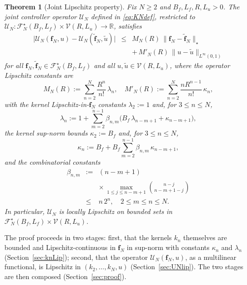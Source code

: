 \documentclass[twocolumn,amsthm]{autart}
\newcommand{\R}{\mathbb{R}}
\newcommand{\Linf}{L^\infty}
\theoremstyle{plain}
\newtheorem{theorem}{Theorem}
\theoremstyle{definition}
\begin{document}
\begin{theorem}[Joint Lipschitz property]
\label{thm:main}
Fix $N\ge 2$ and $B_f, L_f, R, L_u > 0$. The joint controller operator $\mathcal{U}_N$ defined in \eqref{eq:KNdef}, restricted to $\mathcal{U}_N \colon \mathcal{F}_N^\star(B_f,L_f) \times \mathcal{V}(R,L_u) \to \R$, satisfies
\begin{eqnarray}
\bigl|\mathcal{U}_N(\mathbf{f}_N,u) - \mathcal{U}_N(\tilde{\mathbf{f}}_N,\tilde u)\bigr| &\le& M_N(R)\,\|\mathbf{f}_N-\tilde{\mathbf{f}}_N\|_\star \nonumber \\
&& +\, M'_N(R)\,\|u-\tilde u\|_{\Linf(0,1)}
\label{eq:joint-Lip}
\end{eqnarray}
for all $\mathbf{f}_N,\tilde{\mathbf{f}}_N\in\mathcal{F}_N^\star(B_f,L_f)$ and all $u,\tilde u\in\mathcal{V}(R,L_u)$, where the operator Lipschitz constants are
\begin{equation}
M_N(R) := \sum_{n=2}^N \frac{R^n}{n!}\,\lambda_n, \quad M'_N(R) := \sum_{n=2}^N \frac{n R^{n-1}}{n!}\,\kappa_n,
\label{eq:M-def}
\end{equation}
with the kernel Lipschitz-in-$\mathbf{f}_N$ constants $\lambda_2 := 1$ and, for $3\le n\le N$,
\begin{equation}
\lambda_n := 1 + \sum_{m=2}^{n-1} \beta_{n,m}\bigl(B_f\,\lambda_{n-m+1} + \kappa_{n-m+1}\bigr),
\label{eq:lambda-def}
\end{equation}
the kernel sup-norm bounds $\kappa_2 := B_f$ and, for $3\le n\le N$,
\begin{equation}
\kappa_n := B_f + B_f\sum_{m=2}^{n-1} \beta_{n,m}\,\kappa_{n-m+1},
\label{eq:kappa-def}
\end{equation}
and the combinatorial constants
\begin{eqnarray}
\beta_{n,m} &:=& (n-m+1) \nonumber \\
&& \times\, \max_{1\le j\le n-m+1}\binom{n-j}{n-m+1-j} \nonumber \\
&\le& n\,2^n, \quad 2\le m\le n\le N.
\label{eq:beta-def}
\end{eqnarray}
In particular, $\mathcal{U}_N$ is locally Lipschitz on bounded sets in $\mathcal{F}_N^\star(B_f,L_f)\times\mathcal{V}(R,L_u)$.
\end{theorem}

The proof proceeds in two stages: first, that the kernels $k_n$ themselves are bounded and Lipschitz-continuous in $\mathbf{f}_N$ in sup-norm with constants $\kappa_n$ and $\lambda_n$ (Section~\ref{sec:knLip}); second, that the operator $\mathcal{U}_N(\mathbf{f}_N, u)$, as a multilinear functional, is Lipschitz in $(k_2, \ldots, k_N, u)$ (Section~\ref{sec:UNlip}). The two stages are then composed (Section~\ref{sec:proof}).
\end{document}
